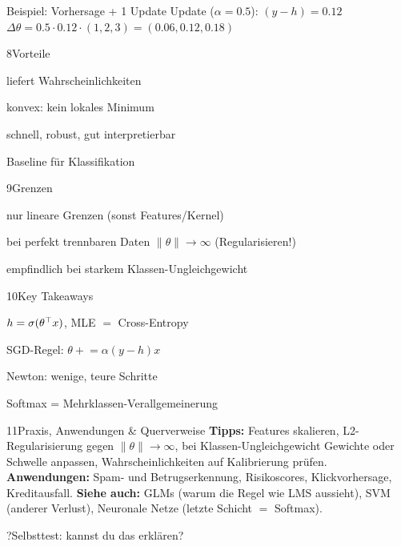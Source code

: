 \begin{hngrid}
\begin{hnex}[raster multicolumn=2]{Beispiel: Vorhersage + 1 Update}
Update ($\alpha=0.5$): $(y-h)=0.12$\\
$\Delta\theta=0.5\cdot0.12\cdot(1,2,3)=(0.06,0.12,0.18)$
\end{hnex}
%
\begin{hnp}[raster multicolumn=2,acc=hngreen]{8}{Vorteile}
\begin{hnpro}
\item liefert Wahrscheinlichkeiten
\item konvex: kein lokales Minimum
\item schnell, robust, gut interpretierbar
\item Baseline für Klassifikation
\end{hnpro}
\end{hnp}
%
\begin{hnp}[raster multicolumn=2,acc=hnred]{9}{Grenzen}
\begin{hncon}
\item nur lineare Grenzen (sonst Features/Kernel)
\item bei perfekt trennbaren Daten $\|\theta\|\to\infty$ (Regularisieren!)
\item empfindlich bei starkem Klassen-Ungleichgewicht
\end{hncon}
\end{hnp}
%
\begin{hnp}[raster multicolumn=2,acc=hnorange]{10}{Key Takeaways}
\begin{hnchk}
\item $h=\sigma(\theta^{\top} x)$, MLE $=$ Cross-Entropy
\item SGD-Regel: $\theta\mathrel{+}=\alpha(y-h)x$
\item Newton: wenige, teure Schritte
\item Softmax = Mehrklassen-Verallgemeinerung
\end{hnchk}
\end{hnp}
%
\begin{hnp}[raster multicolumn=6,acc=hnteal]{11}{Praxis, Anwendungen \& Querverweise}
\textbf{Tipps:} Features skalieren, L2-Regularisierung gegen $\|\theta\|\to\infty$, bei Klassen-Ungleichgewicht Gewichte oder Schwelle anpassen, Wahrscheinlichkeiten auf Kalibrierung prüfen. \textbf{Anwendungen:} Spam- und Betrugserkennung, Risikoscores, Klickvorhersage, Kreditausfall. \textbf{Siehe auch:} GLMs (warum die Regel wie LMS aussieht), SVM (anderer Verlust), Neuronale Netze (letzte Schicht $=$ Softmax).
\end{hnp}
%
\begin{hnp}[raster multicolumn=6,acc=hnpurple,colback=hnlilac!30]{?}{Selbsttest: kannst du das erklären?}

\end{hnp}
\end{hngrid}

